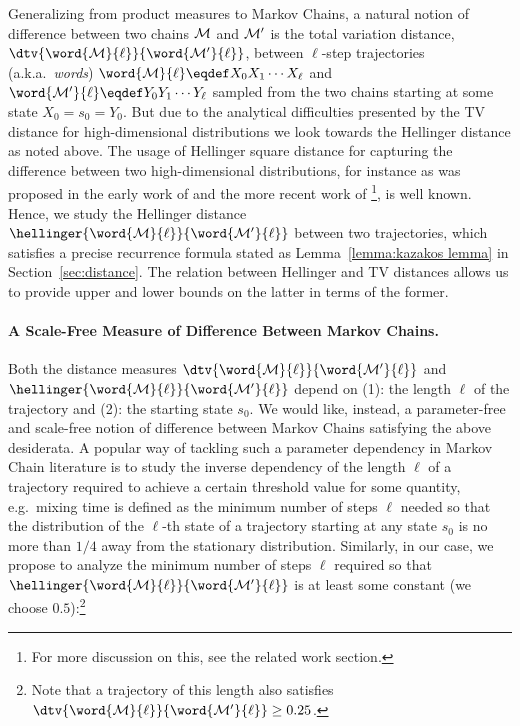 Generalizing from product measures to Markov Chains, a natural notion of difference between two chains $\cal M$ and $\cal M'$ is the total variation distance, $\dtv{\word{\cal M}{\ell}}{\word{\cal M'}{\ell}}$, 
between $\ell$-step trajectories (a.k.a.~{\em words}) $\word{\cal M}{\ell} \eqdef X_0 X_1 \cdots X_{\ell}$ and $\word{\cal M'}{\ell} \eqdef Y_0 Y_1 \cdots Y_{\ell}$ sampled from the two chains starting at some state $X_0=s_0=Y_0$. 
But due to the analytical difficulties presented by the TV distance for high-dimensional distributions we look towards the Hellinger distance as noted above. The usage of Hellinger square distance for capturing the difference between two high-dimensional distributions, for instance as was proposed in the early work of \cite{Kazakos78} and the more recent work of \cite{DaskalakisP17} \footnote{For more discussion on this, see the related work section.}, is well known. Hence, we study the Hellinger distance $\hellinger{\word{\cal M}{\ell}}{\word{\cal M'}{\ell}}$ between two trajectories, which satisfies a precise recurrence formula stated as Lemma~\ref{lemma:kazakos lemma} in Section~\ref{sec:distance}. The relation between Hellinger and TV distances allows us to provide upper and lower bounds on the latter in terms of the former.
\vspace{-5pt}\paragraph{A Scale-Free Measure of Difference Between Markov Chains.} Both the distance measures $\dtv{\word{\cal M}{\ell}}{\word{\cal M'}{\ell}}$ and $\hellinger{\word{\cal M}{\ell}}{\word{\cal M'}{\ell}}$ depend on (1): the length $\ell$ of the trajectory and (2): the starting state $s_0$. We would like, instead, a parameter-free and scale-free notion of difference between Markov Chains satisfying the above desiderata. A popular way of tackling such a parameter dependency in Markov Chain literature is to study the inverse dependency of the length $\ell$ of a trajectory required to achieve a certain threshold value for some quantity, e.g.~mixing time is defined as the minimum number of steps $\ell$ needed so that the distribution of the $\ell$-th state of a trajectory starting at any state $s_0$ is no more than $1/4$ away
from the stationary distribution. Similarly, in our case, we propose to analyze the minimum number of steps $\ell$ required so that $\hellinger{\word{\cal M}{\ell}}{\word{\cal M'}{\ell}}$ is at least some constant (we choose $0.5$):\footnote{Note that a trajectory of this length also satisfies $\dtv{\word{\cal M}{\ell}}{\word{\cal M'}{\ell}} \ge 0.25$.} 

